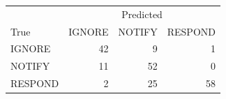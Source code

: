 \begin{tabular}{lrrr}
\toprule
 & \multicolumn{3}{c}{Predicted} \\
True & IGNORE & NOTIFY & RESPOND \\
\midrule
IGNORE & 42 & 9 & 1 \\
NOTIFY & 11 & 52 & 0 \\
RESPOND & 2 & 25 & 58 \\
\bottomrule
\end{tabular}
